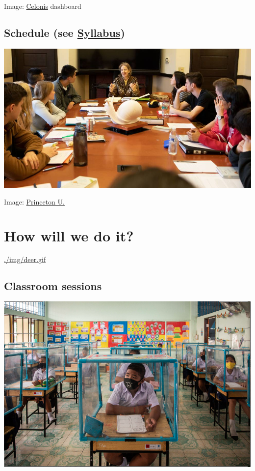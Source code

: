 \documentclass[11pt]{article}
\begin{document}
Image: \href{https://www.celonis.com/}{Celonis} dashboard

\subsection*{Schedule (see \href{https://github.com/birkenkrahe/mod482/blob/main/syllabus.md}{Syllabus})}
\label{sec:org1564940}

\begin{center}
\includegraphics[width=.9\linewidth]{./img/seminar.jpg}
\end{center}

Image: \href{https://www.princeton.edu/news/2018/12/03/life-unpacked-freshman-seminar-explores-search-meaningful-life}{Princeton U.}

\section*{How will we do it?}
\label{sec:org299b909}

\url{./img/deer.gif}

\subsection*{Classroom sessions}
\label{sec:org454faf4}

\begin{center}
\includegraphics[width=.9\linewidth]{./img/classroom.png}
\end{center}
\end{document}
